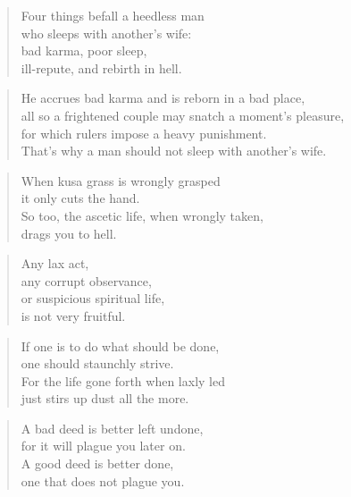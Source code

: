 \documentclass[12pt,openany]{book}%
\begin{document}
\begin{verse}%
Four things befall a heedless man \\
who sleeps with another’s wife: \\
bad karma, poor sleep, \\
ill-repute, and rebirth in hell. 

%
\end{verse}

\begin{verse}%
He accrues bad karma and is reborn in a bad place, \\
all so a frightened couple may snatch a moment’s pleasure, \\
for which rulers impose a heavy punishment. \\
That’s why a man should not sleep with another’s wife. 

%
\end{verse}

\begin{verse}%
When kusa grass is wrongly grasped \\
it only cuts the hand. \\
So too, the ascetic life, when wrongly taken, \\
drags you to hell. 

%
\end{verse}

\begin{verse}%
Any lax act, \\
any corrupt observance, \\
or suspicious spiritual life, \\
is not very fruitful. 

%
\end{verse}

\begin{verse}%
If one is to do what should be done, \\
one should staunchly strive. \\
For the life gone forth when laxly led \\
just stirs up dust all the more. 

%
\end{verse}

\begin{verse}%
A bad deed is better left undone, \\
for it will plague you later on. \\
A good deed is better done, \\
one that does not plague you. 

%
\end{verse}
\end{document}
